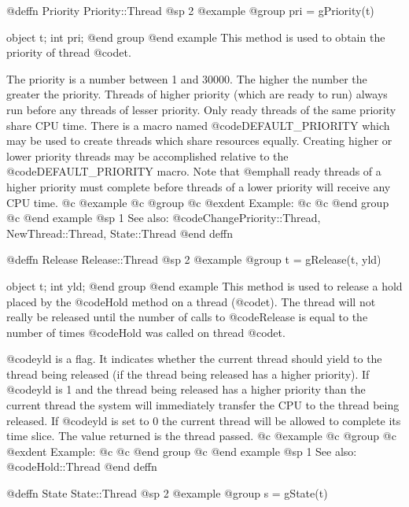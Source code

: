 @deffn {Priority} Priority::Thread
@sp 2
@example
@group
pri = gPriority(t)

object  t;
int     pri;
@end group
@end example
This method is used to obtain the priority of thread @code{t}.

The priority is a number between 1 and 30000.  The higher the number the
greater the priority.  Threads of higher priority (which are ready to
run) always run before any threads of lesser priority.  Only ready
threads of the same priority share CPU time.  There is a macro named
@code{DEFAULT_PRIORITY} which may be used to create threads which share
resources equally.  Creating higher or lower priority threads may be
accomplished relative to the @code{DEFAULT_PRIORITY} macro.  Note that
@emph{all} ready threads of a higher priority must complete before
threads of a lower priority will receive any CPU time.
@c @example
@c @group
@c @exdent Example:
@c 
@c @end group
@c @end example
@sp 1
See also:  @code{ChangePriority::Thread, NewThread::Thread, State::Thread}
@end deffn









@deffn {Release} Release::Thread
@sp 2
@example
@group
t = gRelease(t, yld)

object  t;
int     yld;
@end group
@end example
This method is used to release a hold placed by the @code{Hold}
method on a thread (@code{t}).  The thread will not really be released
until the number of calls to @code{Release} is equal to the number
of times @code{Hold} was called on thread @code{t}.

@code{yld} is a flag.  It indicates whether the current thread should
yield to the thread being released (if the thread being released has a
higher priority).  If @code{yld} is 1 and the thread being released has
a higher priority than the current thread the system will immediately
transfer the CPU to the thread being released.  If @code{yld} is set to
0 the current thread will be allowed to complete its time slice.  The
value returned is the thread passed.
@c @example
@c @group
@c @exdent Example:
@c 
@c @end group
@c @end example
@sp 1
See also:  @code{Hold::Thread}
@end deffn







@deffn {State} State::Thread
@sp 2
@example
@group
s = gState(t)

